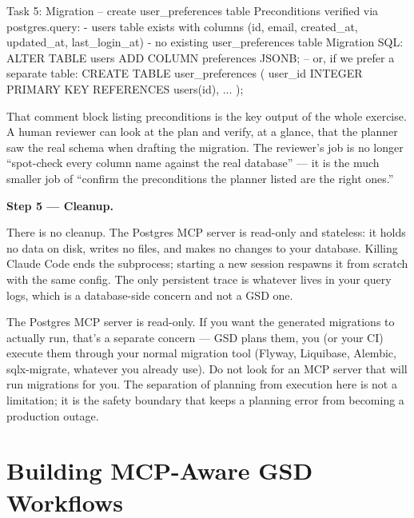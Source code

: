\documentclass[11pt,letterpaper,openany]{book}
\begin{document}
\begin{gsdscenario}
\begin{gsdplain}
Task 5: Migration -- create user_preferences table
  Preconditions verified via postgres.query:
    - users table exists with columns (id, email, created_at,
      updated_at, last_login_at)
    - no existing user_preferences table
  Migration SQL:
    ALTER TABLE users ADD COLUMN preferences JSONB;
    -- or, if we prefer a separate table:
    CREATE TABLE user_preferences (
      user_id INTEGER PRIMARY KEY REFERENCES users(id),
      ...
    );
\end{gsdplain}

That comment block listing preconditions is the key output of the
whole exercise. A human reviewer can look at the plan and verify, at
a glance, that the planner saw the real schema when drafting the
migration. The reviewer's job is no longer ``spot-check every column
name against the real database'' --- it is the much smaller job of
``confirm the preconditions the planner listed are the right ones.''

\vspace{6pt}
\textbf{Step 5 --- Cleanup.}
\vspace{4pt}

There is no cleanup. The Postgres MCP server is read-only and
stateless: it holds no data on disk, writes no files, and makes no
changes to your database. Killing Claude Code ends the subprocess;
starting a new session respawns it from scratch with the same config.
The only persistent trace is whatever lives in your query logs, which
is a database-side concern and not a GSD one.

\vspace{4pt}
\end{gsdscenario}

\begin{gsdimportant}
The Postgres MCP server is read-only. If you want the generated
migrations to actually run, that's a separate concern --- GSD plans
them, you (or your CI) execute them through your normal migration
tool (Flyway, Liquibase, Alembic, sqlx-migrate, whatever you already
use). Do not look for an MCP server that will run migrations for
you. The separation of planning from execution here is not a
limitation; it is the safety boundary that keeps a planning error
from becoming a production outage.
\end{gsdimportant}

\chapter{Building MCP-Aware GSD Workflows}
\end{document}
